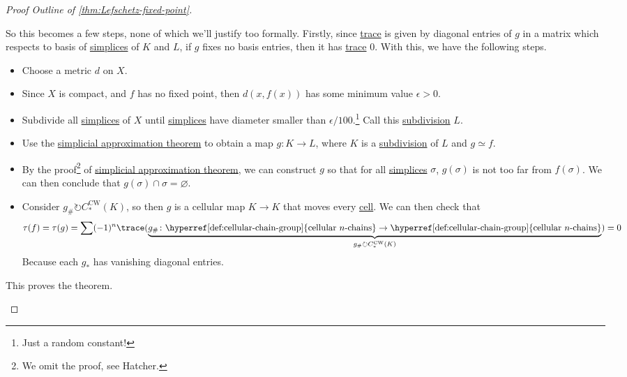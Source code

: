 \begin{proof}[Proof Outline of \autoref{thm:Lefschetz-fixed-point}]
\begin{enumerate}[(1)]
		      So this becomes a few steps, none of which we'll justify too formally. Firstly, since \hyperref[def:trace]{trace} is given by diagonal
		      entries of \(g\) in a matrix which respects to basis of \hyperref[def:standard-simplex]{simplices} of \(K\) and \(L\), if \(g\)
		      fixes no basis entries, then it has \hyperref[def:trace]{trace} \(0\). With this, we have the following steps.
		      \begin{itemize}
			      \item Choose a metric \(d\) on \(X\).
			      \item Since \(X\) is compact, and \(f\) has no fixed point, then \(d(x, f(x))\) has some minimum value \(\epsilon > 0\).
			      \item Subdivide all \hyperref[def:standard-simplex]{simplices} of \(X\) until \hyperref[def:standard-simplex]{simplices} have diameter
			            smaller than \(\epsilon /100\).\footnote{Just a random constant!} Call this \hyperref[eg:Barycentric-subdivision]{subdivision} \(L\).
			      \item Use the \hyperref[thm:simplicial-approximation-theorem]{simplicial approximation theorem} to obtain a map \(g \colon K \to L\),
			            where \(K\) is a \hyperref[eg:Barycentric-subdivision]{subdivision} of \(L\) and \(g \simeq f\).
			      \item By the proof\footnote{We omit the proof, see Hatcher\cite{hatcher2002algebraic}.} of \hyperref[thm:simplicial-approximation-theorem]{simplicial approximation theorem}, we can construct \(g\) so that for
			            all \hyperref[def:standard-simplex]{simplices} \(\sigma\), \(g(\sigma)\) is not too far from \(f(\sigma)\).
			            We can then conclude that \(g(\sigma) \cap \sigma = \varnothing \).
			      \item Consider \(g_\#\circlearrowright C^{\mathrm{CW} }_\ast (K)\), so then \(g\) is a cellular map \(K \to K\) that moves every \hyperref[def:cell]{cell}. We can then check that
			            \[
				            \tau(f) = \tau(g) = \sum (-1)^n \trace(\underbrace{g_\# \colon \text{\hyperref[def:cellular-chain-group]{cellular \(n\)-chains}} \to \text{\hyperref[def:cellular-chain-group]{cellular \(n\)-chains}}}_{g_\#\circlearrowright C^{\mathrm{CW} }_\ast (K)}) = 0
			            \]
			            Because each \(g_\ast\) has vanishing diagonal entries.
		      \end{itemize}
		      This proves the theorem.
	\end{enumerate}
\end{proof}
